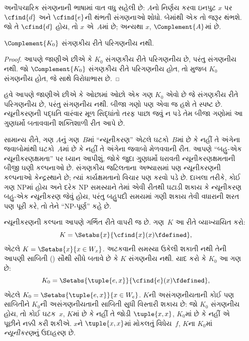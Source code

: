 \begin{explain}
અનૌપચારિક સંગણનાની ભાષામાં વાત વધુ સહેલી છે: $A$નો નિર્ણય
કરવા ઇનપુટ $x$ પર $\cfind{d}$ અને $\cfind{e}$ની થંભતી
સંગણનાઓ શોધો. બેમાંથી એક તો જરૂર થંભશે. જો તે
$\cfind{d}$ હોય, તો $x$ એ~$A$માં છે; અન્યથા
$x$, $\Complement{A}$માં છે.
\end{explain}

\begin{cor}
$\Complement{K_0}$ સંગણકીય રીતે પરિગણનીય નથી.
\end{cor}

\begin{proof}
આપણે જાણીએ છીએ કે $K_0$ સંગણકીય રીતે પરિગણનીય છે,
પરંતુ સંગણનીય નથી. જો $\Complement{K_0}$ સંગણકીય રીતે
પરિગણનીય હોત, તો  મુજબ $K_0$
સંગણનીય હોત, જે  સાથે વિરોધાભાસ છે.
\end{proof}
\endgroup


\begingroup
\makeatletter{}\makeatother

\label{guunit:OLP-0243}


\begin{explain}
હવે આપણે જાણીએ છીએ કે ઓછામાં ઓછો એક ગણ $K_0$ એવો છે જે
સંગણકીય રીતે પરિગણનીય છે, પરંતુ સંગણનીય નથી. બીજા ગણો પણ
એવા જ હશે તે સ્પષ્ટ છે. ન્યૂનીકરણની પદ્ધતિ વારંવાર મૂળ
સિદ્ધાંતો તરફ પાછા જવું ન પડે તેમ બીજા ગણોમાં આ ગુણધર્મો
બતાવવાની શક્તિશાળી રીત આપે છે.

સામાન્ય રીતે, ગણ $A$નું ગણ~$B$માં ``ન્યૂનીકરણ'' એટલે
ઘટકો~$B$માં છે કે નહીં તે અંગેના જવાબોમાંથી
ઘટકો~$A$માં છે કે નહીં તે અંગેના જવાબો મેળવવાની
રીત. આપણે ``બહુ-એક ન્યૂનીકરણક્ષમતા'' પર ધ્યાન આપીશું,
જોકે જુદા ગુણધર્મો ધરાવતી ન્યૂનીકરણક્ષમતાની બીજી ઘણી
કલ્પનાઓ છે. સંગણકીય જટિલતાના અભ્યાસમાં પણ ન્યૂનીકરણની
કલ્પનાઓ કેન્દ્રસ્થાને છે; ત્યાં કાર્યક્ષમતાનો વિચાર પણ
કરવો પડે છે. દાખલા તરીકે, કોઈ ગણ NPમાં હોય અને દરેક NP
સમસ્યાને તેમાં એવી રીતથી ઘટાડી શકાય કે ન્યૂનીકરણ બહુ-એક
ન્યૂનીકરણ જેવું હોય, પરંતુ બહુપદી સમયમાં ગણી શકાય તેવી
વધારાની શરત પણ પૂરી કરે, તો તેને ``NP-પૂર્ણ'' કહે છે.

ન્યૂનીકરણની કલ્પના આપણે ગર્ભિત રીતે વાપરી જ છે. ગણ~$K$
આ રીતે વ્યાખ્યાયિત કરો:
\[
K = \Setabs{x}{\cfind{x}(x) \fdefined},
\]
એટલે $K = \Setabs{x}{x \in W_x}$. અટકવાની સમસ્યા
ઉકેલી શકાતી નથી તેની આપણી સાબિતી
() સૌથી સીધે બતાવે છે કે
$K$ સંગણનીય નથી. યાદ કરો કે $K_0$ આ ગણ છે:
\[
K_0 = \Setabs{\tuple{e, x}}{\cfind{e}(x) \fdefined },
\]
એટલે $K_0 = \Setabs{\tuple{e,x}}{x \in W_e}$.
$K$ની અસંગણનીયતાની કોઈ પણ સાબિતીને $K_0$ની
અસંગણનીયતાની સાબિતી સુધી વિસ્તારી શકાય છે: જો $K_0$
સંગણનીય હોય, તો કોઈ ઘટક~$x$, $K$માં છે કે નહીં
તે જોડી $\tuple{x, x}$, $K_0$માં છે કે નહીં એ પૂછીને નક્કી
કરી શકીએ. $x$ને $\tuple{x, x}$માં મોકલતું વિધેય~$f$,
$K$ના $K_0$માં \emph{ન્યૂનીકરણ}નું ઉદાહરણ છે.
\end{explain}

